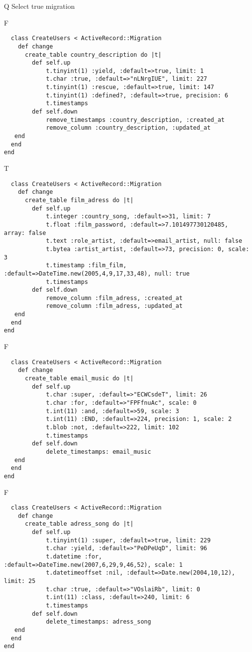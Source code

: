 Q
Select true migration
 
F
\begin{verbatim}
  class CreateUsers < ActiveRecord::Migration
	def change
	  create_table country_description do |t|
	    def self.up
			t.tinyint(1) :yield, :default=>true, limit: 1
   			t.char :true, :default=>"nLNrgIUE", limit: 227
   			t.tinyint(1) :rescue, :default=>true, limit: 147
   			t.tinyint(1) :defined?, :default=>true, precision: 6
   			t.timestamps
		def self.down
			remove_timestamps :country_description, :created_at
			remove_column :country_description, :updated_at
   end
  end 
end
\end{verbatim}

 
T
\begin{verbatim}
  class CreateUsers < ActiveRecord::Migration
	def change
	  create_table film_adress do |t|
	    def self.up
			t.integer :country_song, :default=>31, limit: 7
   			t.float :film_password, :default=>7.101497730120485, array: false
   			t.text :role_artist, :default=>email_artist, null: false
   			t.bytea :artist_artist, :default=>73, precision: 0, scale: 3
   			t.timestamp :film_film, :default=>DateTime.new(2005,4,9,17,33,48), null: true
   			t.timestamps
		def self.down
			remove_column :film_adress, :created_at
			remove_column :film_adress, :updated_at
   end
  end 
end
\end{verbatim}

 
F
\begin{verbatim}
  class CreateUsers < ActiveRecord::Migration
	def change
	  create_table email_music do |t|
	    def self.up
			t.char :super, :default=>"ECWCsdeT", limit: 26
   			t.char :for, :default=>"FPFfnuAc", scale: 0
   			t.int(11) :and, :default=>59, scale: 3
   			t.int(11) :END, :default=>224, precision: 1, scale: 2
   			t.blob :not, :default=>222, limit: 102
   			t.timestamps
		def self.down
			delete_timestamps: email_music
   end
  end 
end
\end{verbatim}

 
F
\begin{verbatim}
  class CreateUsers < ActiveRecord::Migration
	def change
	  create_table adress_song do |t|
	    def self.up
			t.tinyint(1) :super, :default=>true, limit: 229
   			t.char :yield, :default=>"PeDPeUqD", limit: 96
   			t.datetime :for, :default=>DateTime.new(2007,6,29,9,46,52), scale: 1
   			t.datetimeoffset :nil, :default=>Date.new(2004,10,12), limit: 25
   			t.char :true, :default=>"VOslaiRb", limit: 0
   			t.int(11) :class, :default=>240, limit: 6
   			t.timestamps
		def self.down
			delete_timestamps: adress_song
   end
  end 
end
\end{verbatim}
